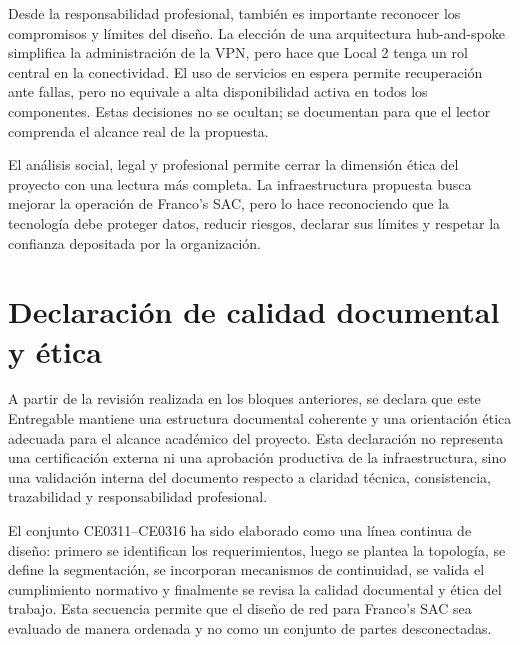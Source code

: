 \documentclass[11pt, a4paper, oneside]{report}
\begin{document}
Desde la responsabilidad profesional, también es importante reconocer los compromisos y límites del diseño. La elección de una arquitectura hub-and-spoke simplifica la administración de la VPN, pero hace que Local 2 tenga un rol central en la conectividad. El uso de servicios en espera permite recuperación ante fallas, pero no equivale a alta disponibilidad activa en todos los componentes. Estas decisiones no se ocultan; se documentan para que el lector comprenda el alcance real de la propuesta.

El análisis social, legal y profesional permite cerrar la dimensión ética del proyecto con una lectura más completa. La infraestructura propuesta busca mejorar la operación de Franco's SAC, pero lo hace reconociendo que la tecnología debe proteger datos, reducir riesgos, declarar sus límites y respetar la confianza depositada por la organización.

\section{Declaración de calidad documental y ética}

A partir de la revisión realizada en los bloques anteriores, se declara que este Entregable mantiene una estructura documental coherente y una orientación ética adecuada para el alcance académico del proyecto. Esta declaración no representa una certificación externa ni una aprobación productiva de la infraestructura, sino una validación interna del documento respecto a claridad técnica, consistencia, trazabilidad y responsabilidad profesional.

El conjunto CE0311--CE0316 ha sido elaborado como una línea continua de diseño: primero se identifican los requerimientos, luego se plantea la topología, se define la segmentación, se incorporan mecanismos de continuidad, se valida el cumplimiento normativo y finalmente se revisa la calidad documental y ética del trabajo. Esta secuencia permite que el diseño de red para Franco's SAC sea evaluado de manera ordenada y no como un conjunto de partes desconectadas.

\renewcommand{\arraystretch}{1.3}
\footnotesize
{}
\end{document}
